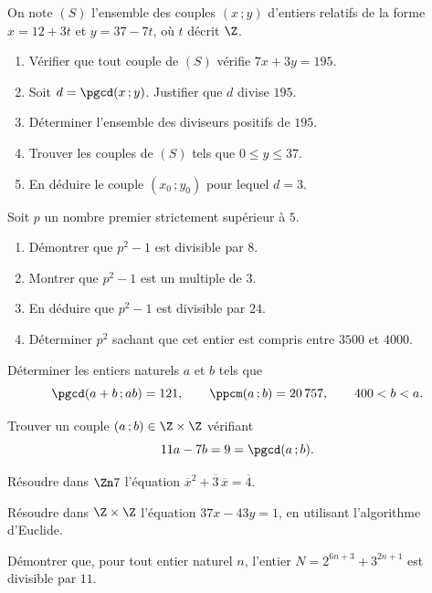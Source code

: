\begin{annales}
On note $(S)$ l'ensemble des couples $(x\,;y)$ d'entiers relatifs de la forme
$x = 12+3t$ et $y = 37-7t$, où $t$ décrit $\Z$.
\begin{enumerate}[label=\textbf{\arabic*)}, leftmargin=*, itemsep=0.15em]
  \item Vérifier que tout couple de $(S)$ vérifie $7x+3y = 195$.
  \item Soit $d = \pgcd(x\,;y)$. Justifier que $d$ divise $195$.
  \item Déterminer l'ensemble des diviseurs positifs de $195$.
  \item Trouver les couples de $(S)$ tels que $0 \leq y \leq 37$.
  \item En déduire le couple $(x_{0}\,;y_{0})$ pour lequel $d = 3$.
\end{enumerate}

Soit $p$ un nombre premier strictement supérieur à $5$.
\begin{enumerate}[label=\textbf{\alph*)}, leftmargin=*, itemsep=0.15em]
  \item Démontrer que $p^{2}-1$ est divisible par $8$.
  \item Montrer que $p^{2}-1$ est un multiple de $3$.
  \item En déduire que $p^{2}-1$ est divisible par $24$.
  \item Déterminer $p^{2}$ sachant que cet entier est compris entre $3500$ et
        $4000$.
\end{enumerate}

Déterminer les entiers naturels $a$ et $b$ tels que
\[
  \pgcd(a+b\,;ab) = 121, \qquad \ppcm(a\,;b) = 20\,757, \qquad 400 < b < a .
\]

Trouver un couple $(a\,;b) \in \Z\times\Z$ vérifiant
\[
  11a-7b = 9 = \pgcd(a\,;b).
\]

Résoudre dans $\Zn 7$ l'équation
$\overline x^{2}+\overline3\,\overline x = \overline4$.

Résoudre dans $\Z\times\Z$ l'équation $37x-43y = 1$, en utilisant l'algorithme
d'Euclide.

Démontrer que, pour tout entier naturel $n$, l'entier
$N = 2^{6n+3}+3^{2n+1}$ est divisible par $11$.
\end{annales}

